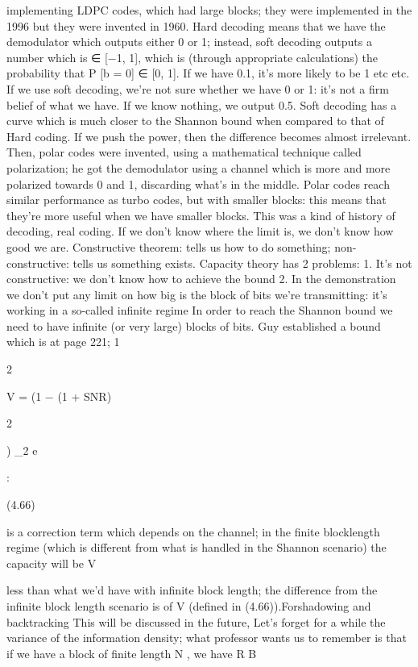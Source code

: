 {{{{{implementing LDPC codes, which had large blocks; they were implemented in the 1996 but they were invented in 1960.
Hard decoding means that we have the demodulator which outputs either 0 or 1; instead,
soft decoding outputs a number which is ∈ [−1, 1], which is (through appropriate calculations) the probability that P [b = 0] ∈ [0, 1]. If we have 0.1, it's more likely to be 1 etc etc.
If we use soft decoding, we're not sure whether we have 0 or 1: it's not a firm belief of what we have. If we know nothing, we output 0.5. Soft decoding has a curve which is much closer to the Shannon bound when compared to that of Hard coding.
If we push the power, then the difference becomes almost irrelevant.
Then, polar codes were invented, using a mathematical technique called polarization; he got the demodulator using a channel which is more and more polarized towards 0 and 1,
discarding what's in the middle. Polar codes reach similar performance as turbo codes,
but with smaller blocks: this means that they're more useful when we have smaller blocks. This was a kind of history of decoding, real coding. If we don't know where the limit is, we don't know how good we are.
Constructive theorem: tells us how to do something; non-constructive: tells us something exists.
Capacity theory has 2 problems:
1. It's not constructive: we don't know how to achieve the bound 2. In the demonstration we don't put any limit on how big is the block of bits we're transmitting: it's working in a so-called infinite regime In order to reach the Shannon bound we need to have infinite (or very large) blocks of bits.
Guy established a bound which is at page 221;
1

2

V = (1 −
(1 + SNR)

2

) \log_2 e

:

(4.66)

is a correction term which depends on the channel; in the finite blocklength regime
(which is different from what is handled in the Shannon scenario) the capacity will be V

less than what we'd have with infinite block length; the difference from the infinite block length scenario is of V (defined in (4.66)).
​Forshadowing and backtracking This will be discussed in the future,
Let's forget for a while the variance of the information density; what professor wants us to remember is that if we have a block of finite length N , we have R B

}}}}}
